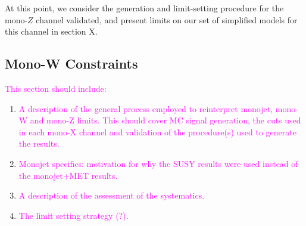 \begin{flushleft}
At this point, we consider the generation and limit-setting procedure for the mono-$Z$ channel validated, and present limits on our set of simplified models for this channel in section X.

\end{flushleft}

\subsection{Mono-W Constraints}
\begin{flushleft}
\end{flushleft}

\begin{flushleft}
\textcolor{magenta}{This section should include:}
\begin{enumerate}
\item \textcolor{magenta}{A description of the general process employed to reinterpret monojet, mono-W and mono-Z limits. This should cover MC signal generation, the cuts used in each mono-X channel and validation of the procedure(s) used to generate the results.}
\item \textcolor{magenta}{Monojet specifics: motivation for why the SUSY results were used instead of the monojet+MET results.}
\item \textcolor{magenta}{A description of the assessment of the systematics.}
\item \textcolor{magenta}{The limit setting strategy (?).}
\end{enumerate}
\end{flushleft}
